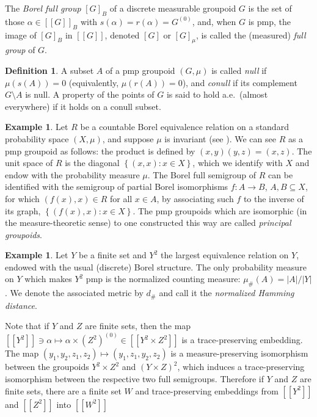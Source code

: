\documentclass[11pt]{amsart}
\theoremstyle{plain}    \newtheorem{theorem}[generalnumbering]{Theorem}
\theoremstyle{plain}    \newtheorem{corollary}[generalnumbering]{Corollary}
\theoremstyle{definition}   \newtheorem{definition}[generalnumbering]{Definition}
\theoremstyle{definition}   \newtheorem{example}[generalnumbering]{Example}
\theoremstyle{plain}    \newtheorem{proposition}[generalnumbering]{Proposition}
\theoremstyle{plain}    \newtheorem{lemma}[generalnumbering]{Lemma}
\theoremstyle{plain}    \newtheorem{plainstyle}[generalnumbering]{\namefordifferentenvironment}
\theoremstyle{plain}    \newtheorem*{plainstyle*}{\namefordifferentenvironment}
\theoremstyle{definition}    \newtheorem{definitionstyle}[generalnumbering]{\namefordifferentenvironment}
\theoremstyle{definition}    \newtheorem*{definitionstyle*}{\namefordifferentenvironment}
\begin{document}
The \emph{Borel full group} $[G]_B$ of a discrete measurable groupoid $G$ is the set of those $\alpha\in[[G]]_B$ with $s(\alpha)=r(\alpha)=G^{(0)}$, and, when $G$ is pmp, the image of $[G]_B$ in $[[G]]$, denoted $[G]$ or $[G]_\mu$, is called the (measured) \emph{full group} of $G$.

\begin{definition}
A subset $A$ of a pmp groupoid $(G,\mu)$ is called \emph{null} if $\mu(s(A))=0$ (equivalently, $\mu(r(A))=0$), and \emph{conull} if its complement $G\setminus A$ is null. A property of the points of $G$ is said to hold a.e.\ (almost everywhere) if it holds on a conull subset.
\end{definition}

\begin{example}
Let $R$ be a countable Borel equivalence relation on a standard probability space $(X,\mu)$, and suppose $\mu$ is invariant (see \cite{MR0578656}). We can see $R$ as a pmp groupoid as follows: the product is defined by $(x,y)(y,z)=(x,z)$. The unit space of $R$ is the diagonal $\left\{(x,x):x\in X\right\}$, which we identify with $X$ and endow with the probability measure $\mu$. The Borel full semigroup of $R$ can be identified with the semigroup of partial Borel isomorphisms $f:A\to B$, $A,B\subseteq X$, for which $(f(x),x)\in R$ for all $x\in A$, by associating such $f$ to the inverse of its graph, $\left\{(f(x),x):x\in X\right\}$. The pmp groupoids which are isomorphic (in the measure-theoretic sense) to one constructed this way are called \emph{principal groupoids}.
\end{example}

\begin{example}\label{examplefinite}
Let $Y$ be a finite set and $Y^2$ the largest equivalence relation on $Y$, endowed with the usual (discrete) Borel structure. The only probability measure on $Y$ which makes $Y^2$ pmp is the normalized counting measure: $\mu_\#(A)=|A|/|Y|$. We denote the associated metric by $d_\#$ and call it the \emph{normalized Hamming distance}.

Note that if $Y$ and $Z$ are finite sets, then the map $[[Y^2]]\ni\alpha\mapsto \alpha\times(Z^2)^{(0)}\in[[Y^2\times Z^2]]$ is a trace-preserving embedding. The map $(y_1,y_2,z_1,z_2)\mapsto (y_1,z_1,y_2,z_2)$ is a measure-preserving isomorphism between the groupoids $Y^2\times Z^2$ and $(Y\times Z)^2$, which induces a trace-preserving isomorphism between the respective two full semigroups. Therefore if $Y$ and $Z$ are finite sets, there are a finite set $W$ and trace-preserving embeddings from $[[Y^2]]$ and $[[Z^2]]$ into $[[W^2]]$
\end{example}
\end{document}
